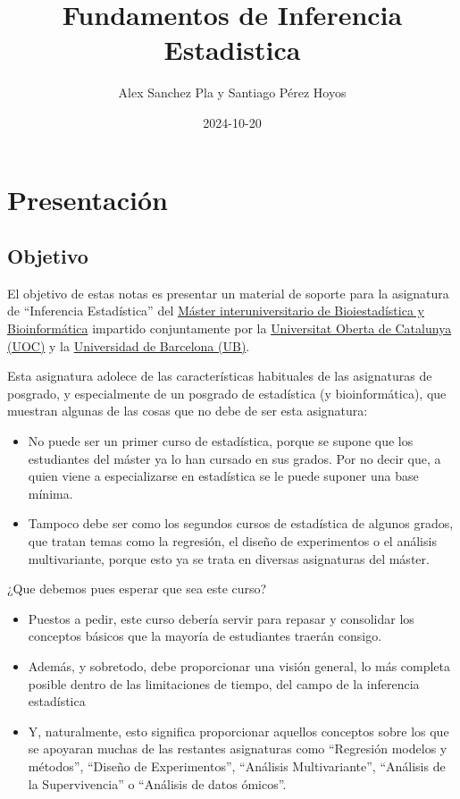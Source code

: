 \documentclass[
]{article}
\title{Fundamentos de Inferencia Estadistica}
\author{Alex Sanchez Pla y Santiago Pérez Hoyos}
\date{2024-10-20}
\providecommand{\tightlist}{%
  \setlength{\itemsep}{0pt}\setlength{\parskip}{0pt}}
\begin{document}
\maketitle

{
\setcounter{tocdepth}{2}
\tableofcontents
}
\section*{Presentación}\label{presentaciuxf3n}

\subsection*{Objetivo}\label{objetivo}

El objetivo de estas notas es presentar un material de soporte para la asignatura de ``Inferencia Estadística'' del \href{https://www.uoc.edu/es/estudios/masters/master-universitario-bioinformatica-bioestadistica}{Máster interuniversitario de Bioiestadística y Bioinformática} impartido conjuntamente por la \href{https://www.uoc.edu}{Universitat Oberta de Catalunya (UOC)} y la \href{https://www.ub.edu}{Universidad de Barcelona (UB)}.

Esta asignatura adolece de las características habituales de las asignaturas de posgrado, y especialmente de un posgrado de estadística (y bioinformática), que muestran algunas de las cosas que no debe de ser esta asignatura:

\begin{itemize}
\tightlist
\item
  No puede ser un primer curso de estadística, porque se supone que los estudiantes del máster ya lo han cursado en sus grados. Por no decir que, a quien viene a especializarse en estadística se le puede suponer una base mínima.
\item
  Tampoco debe ser como los segundos cursos de estadística de algunos grados, que tratan temas como la regresión, el diseño de experimentos o el análisis multivariante, porque esto ya se trata en diversas asignaturas del máster.
\end{itemize}

¿Que debemos pues esperar que sea este curso?

\begin{itemize}
\tightlist
\item
  Puestos a pedir, este curso debería servir para repasar y consolidar los conceptos básicos que la mayoría de estudiantes traerán consigo.
\item
  Además, y sobretodo, debe proporcionar una visión general, lo más completa posible dentro de las limitaciones de tiempo, del campo de la inferencia estadística
\item
  Y, naturalmente, esto significa proporcionar aquellos conceptos sobre los que se apoyaran muchas de las restantes asignaturas como ``Regresión modelos y métodos'', ``Diseño de Experimentos'', ``Análisis Multivariante'', ``Análisis de la Supervivencia'' o ``Análisis de datos ómicos''.
\end{itemize}
\end{document}
